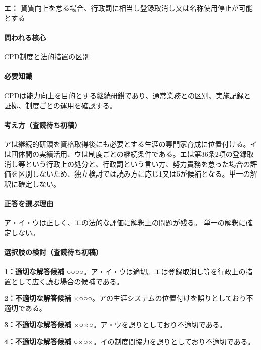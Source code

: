 \noindent\textbf{エ：} 資質向上を怠る場合、行政罰に相当し登録取消し又は名称使用停止が可能とする\par

\paragraph{問われる核心} CPD制度と法的措置の区別

\paragraph{必要知識} CPDは能力向上を目的とする継続研鑚であり、通常業務との区別、実施記録と証拠、制度ごとの運用を確認する。

\paragraph{考え方（査読待ち初稿）} アは継続的研鑚を資格取得後にも必要とする生涯の専門家育成に位置付ける。イは団体間の実績活用、ウは制度ごとの継続条件である。エは第36条2項の登録取消し等という行政上の処分と、行政罰という言い方、努力責務を怠った場合の評価を区別しないため、独立検討では読み方に応じ1又は5が候補となる。単一の解釈に確定しない。

\paragraph{正答を選ぶ理由} ア・イ・ウは正しく、エの法的な評価に解釈上の問題が残る。 単一の解釈に確定しない。

\paragraph{選択肢の検討（査読待ち初稿）}\mbox{}\par

\noindent\textbf{1：適切な解答候補} ○○○○。ア・イ・ウは適切。エは登録取消し等を行政上の措置として広く読む場合の候補である。\par

\noindent\textbf{2：不適切な解答候補} ×○○○。アの生涯システムの位置付けを誤りとしており不適切である。\par

\noindent\textbf{3：不適切な解答候補} ×○×○。ア・ウを誤りとしており不適切である。\par

\noindent\textbf{4：不適切な解答候補} ○×○×。イの制度間協力を誤りとしており不適切である。\par

